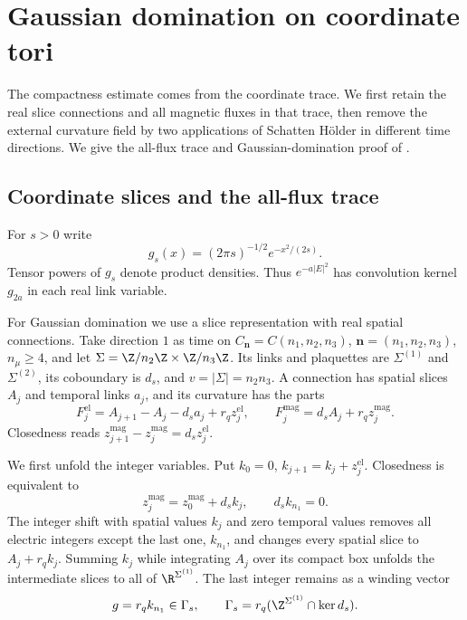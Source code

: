 \section{Gaussian domination on coordinate tori}\label{sec:coordinate}

The compactness estimate comes from the coordinate trace. We first
retain the real slice connections and all magnetic fluxes in that
trace, then remove the external curvature field by two applications
of Schatten H\"older in different time directions. We give the all-flux
trace and Gaussian-domination proof of
\cite[Section~5.8 and Theorem~6.27]{ChamberQED}.

\subsection{Coordinate slices and the all-flux trace}\label{subsec:slab-coordinate-trace}

For $s>0$ write
\[
 g_s(x)=(2\pi s)^{-1/2}e^{-x^2/(2s)}.
\]
Tensor powers of $g_s$ denote product densities. Thus $e^{-a|E|^2}$
has convolution kernel $g_{2a}$ in each real link variable.

For Gaussian domination we use a slice representation with real
spatial connections. Take direction $1$ as time on
$C_{\mathbf n}=C(n_1,n_2,n_3)$, $\mathbf n=(n_1,n_2,n_3)$,
$n_\mu\ge4$, and let
$\Sigma=\Z/n_2\Z\times\Z/n_3\Z$. Its links and plaquettes are
$\Sigma^{(1)}$ and $\Sigma^{(2)}$, its coboundary is $d_s$, and
$v=|\Sigma|=n_2n_3$. A connection has spatial slices $A_j$ and
temporal links $a_j$, and its curvature has the parts
\begin{equation}\label{eq:slab-slice-curvatures}
 F_j^{\mathrm{el}}=A_{j+1}-A_j-d_sa_j+r_qz_j^{\mathrm{el}},
 \qquad F_j^{\mathrm{mag}}=d_sA_j+r_qz_j^{\mathrm{mag}}.
\end{equation}
Closedness reads
$z_{j+1}^{\mathrm{mag}}-z_j^{\mathrm{mag}}=d_sz_j^{\mathrm{el}}$.

We first unfold the integer variables. Put
$k_0=0$, $k_{j+1}=k_j+z_j^{\mathrm{el}}$. Closedness is equivalent to
\[
 z_j^{\mathrm{mag}}=z_0^{\mathrm{mag}}+d_sk_j,
                       \qquad d_sk_{n_1}=0.
\]
The integer shift with spatial values $k_j$ and zero temporal values
removes all electric integers except the last one, $k_{n_1}$, and
changes every spatial slice to $A_j+r_qk_j$. Summing $k_j$ while
integrating $A_j$ over its compact box unfolds the intermediate
slices to all of $\R^{\Sigma^{(1)}}$. The last integer remains as a
winding vector
\[
 g=r_qk_{n_1}\in\Gamma_s,
 \qquad\Gamma_s=r_q(\Z^{\Sigma^{(1)}}\cap\ker d_s).
\]

